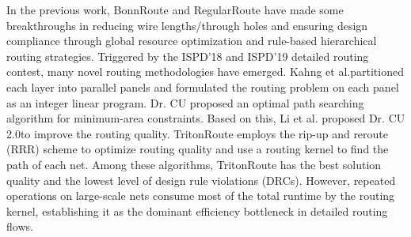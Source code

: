 In the previous work, BonnRoute\cite{Bo2013} and RegularRoute\cite{Re2013} have made some breakthroughs in reducing wire lengths/through holes and ensuring design compliance through global resource optimization and rule-based hierarchical routing strategies. 
Triggered by the ISPD'18\cite{IS2018} and ISPD'19\cite{IS2019} detailed routing contest, many novel routing methodologies have emerged. 
Kahng et al.\cite{Tr2018}partitioned each layer into parallel panels and formulated the routing problem on each panel as an integer linear program. 
Dr. CU\cite{De2019} proposed an optimal path searching algorithm for minimum-area constraints. Based on this, Li et al. proposed Dr. CU 2.0\cite{Dr2019}to improve the routing quality. 
TritonRoute\cite{Tr2021} employs the rip-up and reroute (RRR) scheme to optimize routing quality and use a routing kernel to find the path of each net. 
Among these algorithms, TritonRoute has the best solution quality and the lowest level of design rule violations (DRCs). 
However, repeated operations on large-scale nets consume most of the total runtime by the routing kernel, establishing it as the dominant efficiency bottleneck in detailed routing flows.



